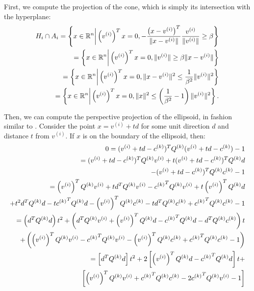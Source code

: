 First, we compute the projection of the cone, which is simply its intersection with the hyperplane:
\begin{align*}
H_i \cap A_i 
= \left\{x \in \mathbb R^n \bigg| \left(v^{(i)}\right)^Tx = 0, -\frac{\left(x - v^{(i)}\right)^T}{\|x - v^{(i)}\|}\frac{v^{(i)}}{\|v^{(i)}\|}\ge \beta \right\} \\
= \left\{x \in \mathbb R^n \bigg| \left(v^{(i)}\right)^Tx = 0, \|v^{(i)}\|\ge \beta\|x - v^{(i)}\| \right\} \\
= \left\{x \in \mathbb R^n \bigg| \left(v^{(i)}\right)^Tx = 0, \|x - v^{(i)}\|^2 \le \frac 1 {\beta^2}\|v^{(i)}\|^2 \right\} \\
= \left\{x \in \mathbb R^n \bigg| \left(v^{(i)}\right)^Tx = 0, \|x\|^2 \le \left(\frac 1 {\beta^2} - 1\right)\|v^{(i)}\|^2 \right\}.
\end{align*}

Then, we can compute the perspective projection of the ellipsoid,  in fashion similar to \cite{eberly_2013}.
Consider the point $x = v^{(i)} + td$ for some unit direction $d$ and distance $t$ from $v^{(i)}$.
If $x$ is on the boundary of the ellipsoid, then:
\begin{align*}
0 = (v^{(i)} + t d - {c^{(k)}} )^T {Q^{(k)}}  (v^{(i)} + t d - {c^{(k)}} ) - 1\\
= (v^{(i)} + t d - {c^{(k)}} )^T {Q^{(k)}}  v^{(i)} + t (v^{(i)} + t d - {c^{(k)}} )^T {Q^{(k)}} d \\ - (v^{(i)} + t d - {c^{(k)}} )^T {Q^{(k)}} {c^{(k)}} - 1\\
= \left(v^{(i)}\right)^T {Q^{(k)}}  v^{(i)} + t d^T {Q^{(k)}}  v^{(i)} - {c^{(k)}} ^T {Q^{(k)}}  v^{(i)} + t \left(v^{(i)}\right)^T {Q^{(k)}}  d \\ + t^2 d^T {Q^{(k)}}  d - t {c^{(k)}} ^T {Q^{(k)}}  d - \left(v^{(i)}\right)^T {Q^{(k)}}  {c^{(k)}}  - t d^T {Q^{(k)}}  {c^{(k)}} + {c^{(k)}} ^T {Q^{(k)}} {c^{(k)}} - 1\\
= \left(d^T{Q^{(k)}} d
\right) t^2 + \left(
d^T {Q^{(k)}}  v^{(i)} +  \left(v^{(i)}\right)^T {Q^{(k)}}  d - {c^{(k)}} ^T {Q^{(k)}}  d - d^T {Q^{(k)}}  {c^{(k)}} 
\right) t \\ +  \left(
\left(v^{(i)}\right)^T {Q^{(k)}}  v^{(i)} - {c^{(k)}} ^T {Q^{(k)}}  v^{(i)} - \left(v^{(i)}\right)^T {Q^{(k)}}  {c^{(k)}}   + {c^{(k)}} ^T {Q^{(k)}}  {c^{(k)}}  - 1
\right) \\
= \left[d^T{Q^{(k)}} d
\right] t^2 + 2\left[
\left(v^{(i)}\right)^T {Q^{(k)}}  d - {c^{(k)}} ^T{Q^{(k)}} d
\right] t + \\ \left[
\left(v^{(i)}\right)^T {Q^{(k)}}  v^{(i)} + {c^{(k)}} ^T {Q^{(k)}}  {c^{(k)}}  - 2 {c^{(k)}} ^T {Q^{(k)}}  v^{(i)} - 1
\right]
\end{align*}

